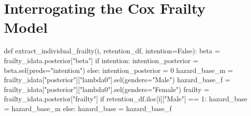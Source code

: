 \documentclass[
  letterpaper,
  DIV=11,
  numbers=noendperiod]{scrartcl}
\newenvironment{Shaded}{\begin{snugshade}}{\end{snugshade}}
\newcommand{\ControlFlowTok}[1]{\textcolor[rgb]{0.00,0.23,0.31}{#1}}
\newcommand{\DecValTok}[1]{\textcolor[rgb]{0.68,0.00,0.00}{#1}}
\newcommand{\KeywordTok}[1]{\textcolor[rgb]{0.00,0.23,0.31}{#1}}
\newcommand{\NormalTok}[1]{\textcolor[rgb]{0.00,0.23,0.31}{#1}}
\newcommand{\OperatorTok}[1]{\textcolor[rgb]{0.37,0.37,0.37}{#1}}
\newcommand{\StringTok}[1]{\textcolor[rgb]{0.13,0.47,0.30}{#1}}
\newcommand{\VariableTok}[1]{\textcolor[rgb]{0.07,0.07,0.07}{#1}}
\begin{document}
\section{Interrogating the Cox Frailty
Model}\label{interrogating-the-cox-frailty-model}

\begin{Shaded}
\begin{Highlighting}[]
\KeywordTok{def}\NormalTok{ extract\_individual\_frailty(i, retention\_df, intention}\OperatorTok{=}\VariableTok{False}\NormalTok{):}
\NormalTok{    beta }\OperatorTok{=}\NormalTok{ frailty\_idata.posterior[}\StringTok{"beta"}\NormalTok{]}
    \ControlFlowTok{if}\NormalTok{ intention:}
\NormalTok{        intention\_posterior }\OperatorTok{=}\NormalTok{ beta.sel(preds}\OperatorTok{=}\StringTok{"intention"}\NormalTok{)}
    \ControlFlowTok{else}\NormalTok{:}
\NormalTok{        intention\_posterior }\OperatorTok{=} \DecValTok{0}
\NormalTok{    hazard\_base\_m }\OperatorTok{=}\NormalTok{ frailty\_idata[}\StringTok{"posterior"}\NormalTok{][}\StringTok{"lambda0"}\NormalTok{].sel(genders}\OperatorTok{=}\StringTok{"Male"}\NormalTok{)}
\NormalTok{    hazard\_base\_f }\OperatorTok{=}\NormalTok{ frailty\_idata[}\StringTok{"posterior"}\NormalTok{][}\StringTok{"lambda0"}\NormalTok{].sel(genders}\OperatorTok{=}\StringTok{"Female"}\NormalTok{)}
\NormalTok{    frailty }\OperatorTok{=}\NormalTok{ frailty\_idata.posterior[}\StringTok{"frailty"}\NormalTok{]}
    \ControlFlowTok{if}\NormalTok{ retention\_df.iloc[i][}\StringTok{"Male"}\NormalTok{] }\OperatorTok{==} \DecValTok{1}\NormalTok{:}
\NormalTok{        hazard\_base }\OperatorTok{=}\NormalTok{ hazard\_base\_m}
    \ControlFlowTok{else}\NormalTok{:}
\NormalTok{        hazard\_base }\OperatorTok{=}\NormalTok{ hazard\_base\_f}


\end{Highlighting}
\end{Shaded}
\end{document}
